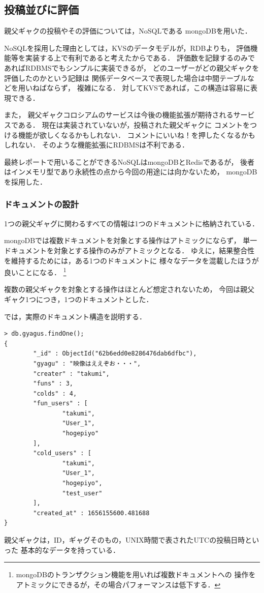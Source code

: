 \documentclass[a4paper,11pt]{jsreport}
\begin{document}
\subsection{投稿並びに評価}
親父ギャクの投稿やその評価については，NoSQLである
mongoDBを用いた．

NoSQLを採用した理由としては，KVSのデータモデルが，RDBよりも，
評価機能等を実装する上で有利であると考えたからである．
評価数を記録するのみであればRDBMSでもシンプルに実装できるが，
どのユーザーがどの親父ギャクを評価したのかという記録は
関係データベースで表現した場合は中間テーブルなどを用いねばならず，
複雑になる．
対してKVSであれば，この構造は容易に表現できる．

また，
親父ギャクコロシアムのサービスは今後の機能拡張が期待されるサービスである．
現在は実装されていないが，投稿された親父ギャクに
コメントをつける機能が欲しくなるかもしれない．
コメントにいいね！を押したくなるかもしれない．
そのような機能拡張にRDBMSは不利である．

最終レポートで用いることができるNoSQLはmongoDBとRedisであるが，
後者はインメモリ型であり永続性の点から今回の用途には向かないため，
mongoDBを採用した．

\subsubsection{ドキュメントの設計}
1つの親父ギャグに関わるすべての情報は1つのドキュメントに格納されている．

mongoDBでは複数ドキュメントを対象とする操作はアトミックにならず，
単一ドキュメントを対象とする操作のみがアトミックとなる\cite{mongoAT}．
ゆえに，結果整合性を維持するためには，ある1つのドキュメントに
様々なデータを混載したほうが良いことになる．
\footnote{mongoDBのトランザクション機能を用いれば複数ドキュメントへの
操作をアトミックにできるが，その場合パフォーマンスは低下する．}

複数の親父ギャクを対象とする操作はほとんど想定されないため，
今回は親父ギャク1つにつき，1つのドキュメントとした．

では，実際のドキュメント構造を説明する．
\begin{lstlisting}
> db.gyagus.findOne();
{
        "_id" : ObjectId("62b6edd0e8286476dab6dfbc"),
        "gyagu" : "映像はええぞお・・・",
        "creater" : "takumi",
        "funs" : 3,
        "colds" : 4,
        "fun_users" : [
                "takumi",
                "User_1",
                "hogepiyo"
        ],
        "cold_users" : [
                "takumi",
                "User_1",
                "hogepiyo",
                "test_user"
        ],
        "created_at" : 1656155600.481688
}
\end{lstlisting}
親父ギャクは，ID，ギャグそのもの，UNIX時間で表されたUTCの投稿日時といった
基本的なデータを持っている．
\end{document}
